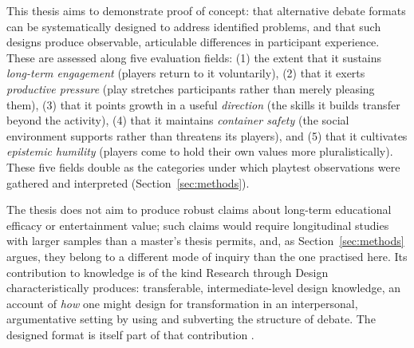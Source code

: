 This thesis aims to demonstrate proof of concept: that alternative debate formats can be systematically designed to address identified problems, and that such designs produce observable, articulable differences in participant experience. These are assessed along five evaluation fields: (1) the extent that it sustains \emph{long-term engagement} (players return to it voluntarily), (2) that it exerts \emph{productive pressure} (play stretches participants rather than merely pleasing them), (3) that it points growth in a useful \emph{direction} (the skills it builds transfer beyond the activity), (4) that it maintains \emph{container safety} (the social environment supports rather than threatens its players), and (5) that it cultivates \emph{epistemic humility} (players come to hold their own values more pluralistically). These five fields double as the categories under which playtest observations were gathered and interpreted (Section~\ref{sec:methods}).

The thesis does not aim to produce robust claims about long-term educational efficacy or entertainment value; such claims would require longitudinal studies with larger samples than a master's thesis permits, and, as Section~\ref{sec:methods} argues, they belong to a different mode of inquiry than the one practised here. Its contribution to knowledge is of the kind Research through Design characteristically produces: transferable, intermediate-level design knowledge, an account of \emph{how} one might design for transformation in an interpersonal, argumentative setting by using and subverting the structure of debate. The designed format is itself part of that contribution \parencite{zimmerman2007research}.
